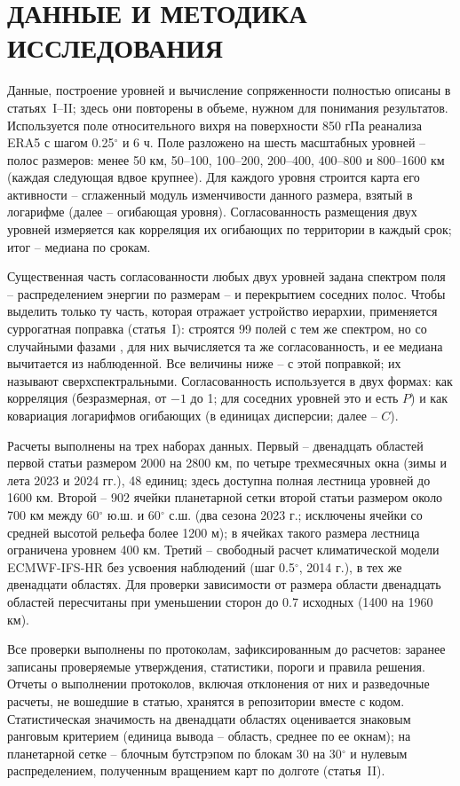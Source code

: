 \documentclass[12pt,a4paper]{article}
\begin{document}
\section{ДАННЫЕ И МЕТОДИКА ИССЛЕДОВАНИЯ}

Данные, построение уровней и вычисление сопряженности полностью описаны в статьях~I--II; здесь они повторены в объеме, нужном для понимания результатов. Используется поле относительного вихря на поверхности 850 гПа реанализа ERA5 \cite{Hersbach2020,Soci2024} с шагом 0.25$^\circ$ и 6 ч. Поле разложено на шесть масштабных уровней -- полос размеров: менее 50 км, 50--100, 100--200, 200--400, 400--800 и 800--1600 км (каждая следующая вдвое крупнее). Для каждого уровня строится карта его активности -- сглаженный модуль изменчивости данного размера, взятый в логарифме (далее -- огибающая уровня). Согласованность размещения двух уровней измеряется как корреляция их огибающих по территории в каждый срок; итог -- медиана по срокам.

Существенная часть согласованности любых двух уровней задана спектром поля -- распределением энергии по размерам -- и перекрытием соседних полос. Чтобы выделить только ту часть, которая отражает устройство иерархии, применяется суррогатная поправка (статья~I): строятся 99 полей с тем же спектром, но со случайными фазами \cite{Basu2007}, для них вычисляется та же согласованность, и ее медиана вычитается из наблюденной. Все величины ниже -- с этой поправкой; их называют сверхспектральными. Согласованность используется в двух формах: как корреляция (безразмерная, от $-1$ до 1; для соседних уровней это и есть $P$) и как ковариация логарифмов огибающих (в единицах дисперсии; далее -- $C$).

Расчеты выполнены на трех наборах данных. Первый -- двенадцать областей первой статьи размером 2000 на 2800 км, по четыре трехмесячных окна (зимы и лета 2023 и 2024 гг.), 48 единиц; здесь доступна полная лестница уровней до 1600 км. Второй -- 902 ячейки планетарной сетки второй статьи размером около 700 км между 60$^\circ$ ю.ш. и 60$^\circ$ с.ш. (два сезона 2023 г.; исключены ячейки со средней высотой рельефа более 1200 м); в ячейках такого размера лестница ограничена уровнем 400 км. Третий -- свободный расчет климатической модели ECMWF-IFS-HR \cite{Haarsma2016,Roberts2018} без усвоения наблюдений (шаг 0.5$^\circ$, 2014 г.), в тех же двенадцати областях. Для проверки зависимости от размера области двенадцать областей пересчитаны при уменьшении сторон до 0.7 исходных (1400 на 1960 км).

Все проверки выполнены по протоколам, зафиксированным до расчетов: заранее записаны проверяемые утверждения, статистики, пороги и правила решения. Отчеты о выполнении протоколов, включая отклонения от них и разведочные расчеты, не вошедшие в статью, хранятся в репозитории вместе с кодом. Статистическая значимость на двенадцати областях оценивается знаковым ранговым критерием (единица вывода -- область, среднее по ее окнам); на планетарной сетке -- блочным бутстрэпом по блокам 30 на 30$^\circ$ и нулевым распределением, полученным вращением карт по долготе (статья~II).
\end{document}
